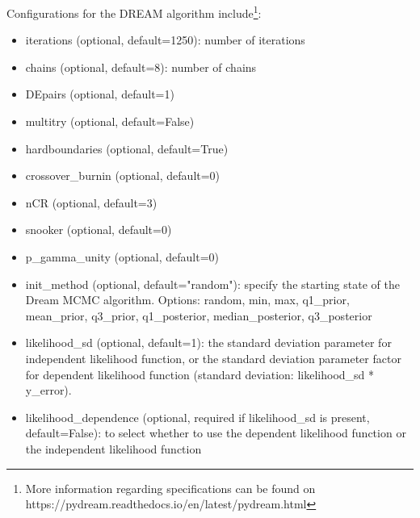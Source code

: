 Configurations for the DREAM algorithm include\footnote{More information regarding specifications can be found on https://pydream.readthedocs.io/en/latest/pydream.html}:
\begin{itemize}
    \item iterations (optional, default=1250): number of iterations
\item chains (optional, default=8): number of chains
\item DEpairs (optional, default=1)
\item multitry (optional, default=False)
\item hardboundaries (optional, default=True)
\item crossover\_burnin (optional, default=0)
\item nCR (optional, default=3)
\item snooker (optional, default=0)
\item p\_gamma\_unity (optional, default=0)
\item init\_method (optional, default="random"): specify the starting state of the Dream MCMC algorithm. Options: random, min, max, q1\_prior, mean\_prior, q3\_prior, q1\_posterior, median\_posterior, q3\_posterior
\item likelihood\_sd (optional, default=1): the standard deviation parameter for independent likelihood function, or the standard deviation parameter factor for dependent likelihood function (standard deviation: likelihood\_sd * y\_error).
\item likelihood\_dependence (optional, required if likelihood\_sd is present, default=False): to select whether to use the dependent likelihood function or the independent likelihood function  
\end{itemize}
